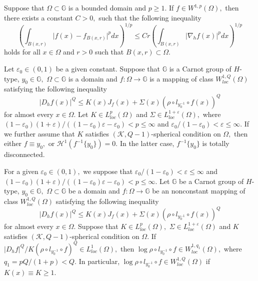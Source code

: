 \documentclass[10pt,a4paper]{amsart}
\begin{document}
\begin{lem}\label{-11}
Suppose that $\Omega\subset\mathbb{G}$ is a bounded domain and $p\geq1$. If $f\in W^{1,p}(\Omega),$ then there exists a constant $C>0,$ such that the following inequality
\begin{equation}\label{0311888888000}
\left(\int_{B(x,r)}\vert f(x)-f_{B(x,r)}\vert^{p}dx\right)^{1/ p}\leq Cr\left(\int_{B(x,r)}\vert \nabla_{h}f(x)\vert^{p}dx\right)^{1/p}
\end{equation}
holds for all $x\in\Omega$ and $r>0$ such that $B(x,r)\subset\Omega.$
\end{lem}

\begin{lem}\label{101209}
Let $\varepsilon_{0}\in(0,1)$ be a given constant. Suppose that $\mathbb{G}$ is a Carnot group of $H$-type,  $y_{0}\in\mathbb{G},$ $\Omega\subset\mathbb{G}$ is a domain and $f:\Omega\rightarrow \mathbb{G}$ is a mapping of class $W_{loc}^{1,Q}(\Omega)$ satisfying  the following inequality
$$\vert D_{h}f(x)\vert^{Q}\leq K(x)J_{f}(x)+\Sigma(x)(\rho\circ l_{y_{0}^{-1}}\circ f(x))^{Q}$$
for almost every $x\in\Omega.$ Let $K\in L_{loc}^{p}(\Omega)$ and $\Sigma\in L_{loc}^{1+\varepsilon}(\Omega),$ where $(1-\varepsilon_{0})(1+\varepsilon)/((1-\varepsilon_{0})\varepsilon-\varepsilon_{0})<p\leq\infty$ and $\varepsilon_{0}/(1-\varepsilon_{0})<\varepsilon\leq\infty.$  If we further assume that $K$  satisfies $(\mathcal{K},Q-1)$-spherical  condition on $\Omega,$ then either $f\equiv y_{0},$ or $\mathcal{H}^{1}(f^{-1}\{y_{0}\})=0.$  In the latter case, $f^{-1}\{y_{0}\}$ is totally disconnected.
\end{lem}

\begin{lem} \label{lemma3522}
For a given $\varepsilon_{0}\in(0,1),$ we suppose that $\varepsilon_{0}/(1-\varepsilon_{0})<\varepsilon\leq\infty$ and $(1-\varepsilon_{0})(1+\varepsilon)/((1-\varepsilon_{0})\varepsilon-\varepsilon_{0})<p\leq\infty.$ Let $\mathbb{G}$ be a Carnot group of $H$-type,  $y_{0}\in\mathbb{G},$ $\Omega\subset\mathbb{G}$ be a domain and $f:\Omega\rightarrow \mathbb{G}$ be an nonconstant mapping of class $W_{loc}^{1,Q}(\Omega)$ satisfying  the following inequality
$$\vert D_{h}f(x)\vert^{Q}\leq K(x)J_{f}(x)+\Sigma(x)(\rho\circ l_{y_{0}^{-1}}\circ f(x))^{Q}$$
for almost every $x\in\Omega.$ Suppose that $K\in L_{loc}^{p}(\Omega),$  $\Sigma\in L_{loc}^{1+\varepsilon}(\Omega)$  and $K$ satisfies $(\mathcal{K},Q-1)$-spherical  condition on $\Omega.$ If $\vert D_{h}f\vert^{Q}/K(\rho\circ l_{y_{0}^{-1}}\circ f)^{Q}\in L_{loc}^{1}(\Omega),$
then $\log\rho\circ l_{y_{0}^{-1}}\circ f\in W_{loc}^{1,q_{1}}(\Omega),$ where $q_{1}=pQ/(1+p)<Q.$ In particular, $\log\rho\circ l_{y_{0}^{-1}}\circ f\in W_{loc}^{1,Q}(\Omega)$ if $K(x)\equiv K\geq1.$
\end{lem}
\end{document}
